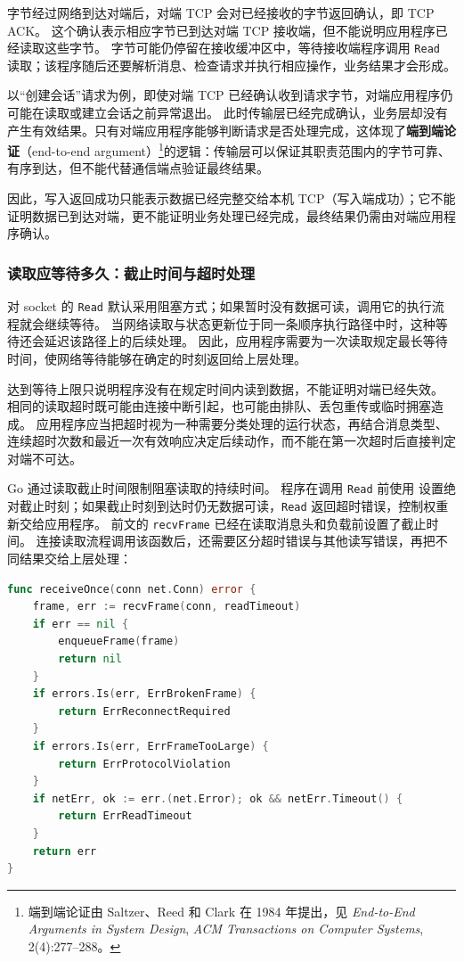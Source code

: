 字节经过网络到达对端后，对端 TCP 会对已经接收的字节返回确认，即 TCP ACK。
这个确认表示相应字节已到达对端 TCP 接收端，但不能说明应用程序已经读取这些字节。
字节可能仍停留在接收缓冲区中，等待接收端程序调用 \texttt{Read} 读取；该程序随后还要解析消息、检查请求并执行相应操作，业务结果才会形成。

以“创建会话”请求为例，即使对端 TCP 已经确认收到请求字节，对端应用程序仍可能在读取或建立会话之前异常退出。
此时传输层已经完成确认，业务层却没有产生有效结果。只有对端应用程序能够判断请求是否处理完成，这体现了\textbf{端到端论证}（end-to-end argument）\footnote{端到端论证由 Saltzer、Reed 和 Clark 在 1984 年提出，见 \textit{End-to-End Arguments in System Design}, \textit{ACM Transactions on Computer Systems}, 2(4):277--288。}的逻辑：传输层可以保证其职责范围内的字节可靠、有序到达，但不能代替通信端点验证最终结果。

因此，写入返回成功只能表示数据已经完整交给本机 TCP（写入端成功）；它不能证明数据已到达对端，更不能证明业务处理已经完成，最终结果仍需由对端应用程序确认。

\subsubsection{读取应等待多久：截止时间与超时处理}\label{sec2:timeout-control}

对 socket 的 \texttt{Read} 默认采用阻塞方式；如果暂时没有数据可读，调用它的执行流程就会继续等待。
当网络读取与状态更新位于同一条顺序执行路径中时，这种等待还会延迟该路径上的后续处理。
因此，应用程序需要为一次读取规定最长等待时间，使网络等待能够在确定的时刻返回给上层处理。

达到等待上限只说明程序没有在规定时间内读到数据，不能证明对端已经失效。
相同的读取超时既可能由连接中断引起，也可能由排队、丢包重传或临时拥塞造成。
应用程序应当把超时视为一种需要分类处理的运行状态，再结合消息类型、连续超时次数和最近一次有效响应决定后续动作，而不能在第一次超时后直接判定对端不可达。

Go 通过读取截止时间限制阻塞读取的持续时间。
程序在调用 \texttt{Read} 前使用  设置绝对截止时刻；如果截止时刻到达时仍无数据可读，\texttt{Read} 返回超时错误，控制权重新交给应用程序。
前文的 \texttt{recvFrame} 已经在读取消息头和负载前设置了截止时间。
连接读取流程调用该函数后，还需要区分超时错误与其他读写错误，再把不同结果交给上层处理：

\begin{tcolorbox}[title=读取超时的识别与上报（概念示例）]
\begin{lstlisting}[style=codeblock, language=go]
func receiveOnce(conn net.Conn) error {
    frame, err := recvFrame(conn, readTimeout)
    if err == nil {
        enqueueFrame(frame)
        return nil
    }
    if errors.Is(err, ErrBrokenFrame) {
        return ErrReconnectRequired
    }
    if errors.Is(err, ErrFrameTooLarge) {
        return ErrProtocolViolation
    }
    if netErr, ok := err.(net.Error); ok && netErr.Timeout() {
        return ErrReadTimeout
    }
    return err
}
\end{lstlisting}
\end{tcolorbox}

